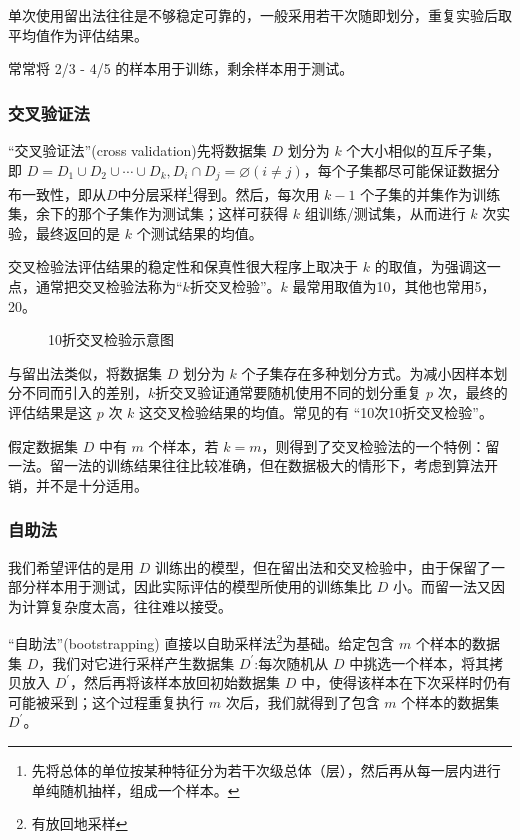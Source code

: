 单次使用留出法往往是不够稳定可靠的，一般采用若干次随即划分，重复实验后取平均值作为评估结果。

常常将 2/3 - 4/5 的样本用于训练，剩余样本用于测试。

\subsubsection{交叉验证法}

``交叉验证法''(cross validation)先将数据集 $D$ 划分为 $k$ 个大小相似的互斥子集，即 $D = D_1 \cup D_2 \cup \cdots \cup D_k,D_i \cap D_j = \varnothing (i\neq j)$，每个子集都尽可能保证数据分布一致性，即从$D$中分层采样\footnote{先将总体的单位按某种特征分为若干次级总体（层），然后再从每一层内进行单纯随机抽样，组成一个样本。}得到。然后，每次用 $k-1$ 个子集的并集作为训练集，余下的那个子集作为测试集；这样可获得 $k$ 组训练/测试集，从而进行 $k$ 次实验，最终返回的是 $k$ 个测试结果的均值。

交叉检验法评估结果的稳定性和保真性很大程序上取决于 $k$ 的取值，为强调这一点，通常把交叉检验法称为``$k$折交叉检验''。$k$ 最常用取值为10，其他也常用5，20。

\begin{figure}[H]
    \centering
    \caption{10折交叉检验示意图}
    \label{10折交叉检验示意图}
\end{figure}

与留出法类似，将数据集 $D$ 划分为 $k$ 个子集存在多种划分方式。为减小因样本划分不同而引入的差别，$k$折交叉验证通常要随机使用不同的划分重复 $p$ 次，最终的评估结果是这 $p$ 次 $k$ 这交叉检验结果的均值。常见的有 ``10次10折交叉检验''。

假定数据集 $D$ 中有 $m$ 个样本，若 $k=m$，则得到了交叉检验法的一个特例：留一法。留一法的训练结果往往比较准确，但在数据极大的情形下，考虑到算法开销，并不是十分适用。

\subsubsection{自助法}

我们希望评估的是用 $D$ 训练出的模型，但在留出法和交叉检验中，由于保留了一部分样本用于测试，因此实际评估的模型所使用的训练集比 $D$ 小。而留一法又因为计算复杂度太高，往往难以接受。

``自助法''(bootstrapping) 直接以自助采样法\footnote{有放回地采样}为基础。给定包含 $m$ 个样本的数据集 $D$，我们对它进行采样产生数据集 $D^{'}$:每次随机从 $D$ 中挑选一个样本，将其拷贝放入 $D^{'}$，然后再将该样本放回初始数据集 $D$ 中，使得该样本在下次采样时仍有可能被采到；这个过程重复执行 $m$ 次后，我们就得到了包含 $m$ 个样本的数据集 $D^{'}$。


